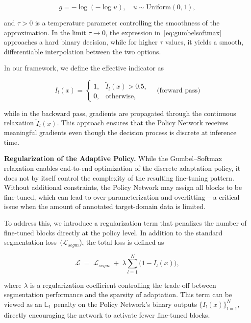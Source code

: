 \[ g = -\log(-\log u), \quad u \sim \mathrm{Uniform}(0,1), \]

\noindent
and $\tau > 0$ is a temperature parameter controlling the smoothness of the approximation. In the limit $\tau \to 0$, the expression in~\eqref{eq:gumbelsoftmax} approaches a hard binary decision, while for higher $\tau$ values, it yields a smooth, differentiable interpolation between the two options. %

In our framework, we define the effective indicator as

\[
I_l(x) =
\begin{cases}
	1, & \tilde{I}_l(x) > 0.5, \\
	0, & \text{otherwise},
\end{cases}
\quad \text{(forward pass)}
\]

\noindent
while in the backward pass, gradients are propagated through the continuous relaxation $\tilde{I}_l(x)$. This approach ensures that the Policy Network receives meaningful gradients even though the decision process is discrete at inference time.

\textbf{Regularization of the Adaptive Policy.} While the Gumbel–Softmax relaxation enables end-to-end optimization of the discrete adaptation policy, it does not by itself control the complexity of the resulting fine-tuning pattern. Without additional constraints, the Policy Network may assign all blocks to be fine-tuned, which can lead to over-parameterization and overfitting -- a critical issue when the amount of annotated target-domain data is limited.

To address this, we introduce a regularization term that penalizes the number of fine-tuned blocks directly at the policy level. In addition to the standard segmentation loss~($\mathcal{L}_{segm}$), the total loss is defined as


\begin{equation}
	\mathcal{L} \;=\; \mathcal{L}_{segm}
	\;+\;
	\lambda \sum_{l=1}^{N} \big(1 - I_l(x)\big),
	\label{eq:loss_total}
\end{equation}

\noindent
where $\lambda$ is a regularization coefficient controlling the trade-off between segmentation performance and the sparsity of adaptation. This term can be viewed as an $\mathbb{L}_1$ penalty on the Policy Network’s binary outputs $\{I_l(x)\}_{l=1}^N$, directly encouraging the network to activate fewer fine-tuned blocks.

